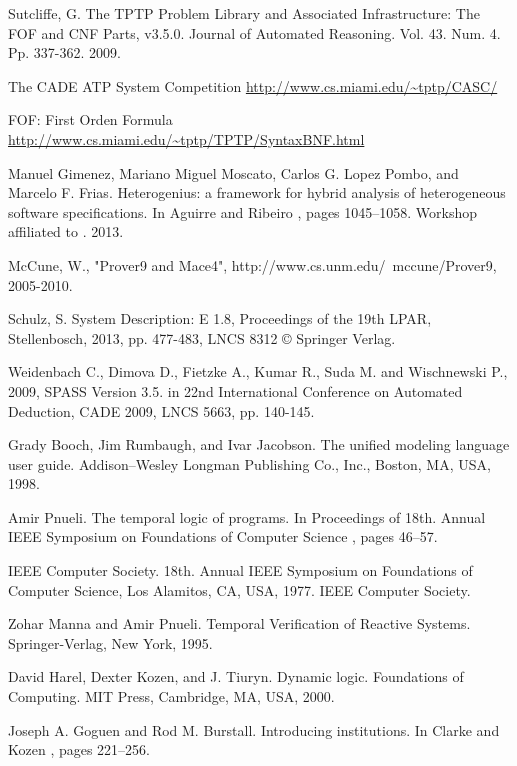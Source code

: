 
\begin{thebibliography}{tesis}

	Sutcliffe, G. The TPTP Problem Library and Associated Infrastructure: The FOF and CNF Parts, v3.5.0. Journal of Automated Reasoning. Vol. 43. Num. 4. Pp. 337-362. 2009.

	The CADE ATP System Competition
	\url{http://www.cs.miami.edu/~tptp/CASC/}

	FOF: First Orden Formula
	\url{http://www.cs.miami.edu/~tptp/TPTP/SyntaxBNF.html}

	Manuel Gimenez, Mariano Miguel Moscato, Carlos G. Lopez Pombo, and Marcelo F. Frias. Heterogenius: a framework for hybrid analysis of heterogeneous software specifications. In Aguirre and Ribeiro \cite{AR13}, pages 1045–1058. Workshop affiliated to \cite{DM13}. 2013.
	
	McCune, W., "Prover9 and Mace4", http://www.cs.unm.edu/~mccune/Prover9, 2005-2010. 

  Schulz, S. System Description: E 1.8, Proceedings of the 19th LPAR, Stellenbosch, 2013, pp. 477-483, LNCS 8312 © Springer Verlag.

 Weidenbach C., Dimova D., Fietzke A., Kumar R., Suda M. and Wischnewski P., 2009, SPASS Version 3.5. in 22nd International Conference on Automated Deduction, CADE 2009, LNCS 5663, pp. 140-145.

 Grady Booch, Jim Rumbaugh, and Ivar Jacobson. The unified modeling language user guide. Addison–Wesley Longman Publishing Co., Inc., Boston, MA, USA, 1998.

 Amir Pnueli. The temporal logic of programs. In Proceedings of 18th. Annual IEEE Symposium on Foundations of Computer Science \cite{IEE77}, pages 46–57. 

 IEEE Computer Society. 18th. Annual IEEE Symposium on Foundations of Computer Science, Los Alamitos, CA, USA, 1977. IEEE Computer Society. 

 Zohar Manna and Amir Pnueli. Temporal Verification of Reactive Systems. Springer-Verlag, New York, 1995. 

 David Harel, Dexter Kozen, and J. Tiuryn. Dynamic logic. Foundations of Computing. MIT Press, Cambridge, MA, USA, 2000.  

 Joseph A. Goguen and Rod M. Burstall. Introducing institutions. In Clarke and Kozen \cite{CK84}, pages 221–256.  


\end{thebibliography}
